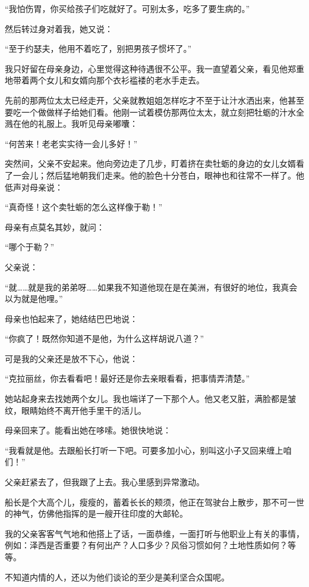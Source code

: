 \documentclass[12pt,UTF-8,openany]{ctexbook}
\begin{document}
\begin{large}
    “我怕伤胃，你买给孩子们吃就好了。可别太多，吃多了要生病的。”
    
    然后转过身对着我，她又说：
    
    “至于约瑟夫，他用不着吃了，别把男孩子惯坏了。”
    
    我只好留在母亲身边，心里觉得这种待遇很不公平。我一直望着父亲，看见他郑重地带着两个女儿和女婿向那个衣衫褴褛的老水手走去。
    
    先前的那两位太太已经走开，父亲就教姐姐怎样吃才不至于让汁水洒出来，他甚至要吃一个做做样子给她们看。他刚一试着模仿那两位太太，就立刻把牡蛎的汁水全溅在他的礼服上。我听见母亲嘟囔：
    
    “何苦来！老老实实待一会儿多好！”
    
    突然间，父亲不安起来。他向旁边走了几步，盯着挤在卖牡蛎的身边的女儿女婿看了一会儿；然后猛地朝我们走来。他的脸色十分苍白，眼神也和往常不一样了。他低声对母亲说：
    
    “真奇怪！这个卖牡蛎的怎么这样像于勒！”
    
    母亲有点莫名其妙，就问：
    
    “哪个于勒？”
    
    父亲说：
    
    “就……就是我的弟弟呀……如果我不知道他现在是在美洲，有很好的地位，我真会以为就是他哩。”
    
    母亲也怕起来了，她结结巴巴地说：
    
    “你疯了！既然你知道不是他，为什么这样胡说八道？”
    
    可是我的父亲还是放不下心，他说：
    
    “克拉丽丝，你去看看吧！最好还是你去亲眼看看，把事情弄清楚。”
    
    她站起身来去找她两个女儿。我也端详了一下那个人。他又老又脏，满脸都是皱纹，眼睛始终不离开他手里干的活儿。
    
    母亲回来了。能看出她在哆嗦。她很快地说：
    
    “我看就是他。去跟船长打听一下吧。可要多加小心，别叫这小子又回来缠上咱们！”
    
    父亲赶紧去了，但我跟了上去。我心里感到异常激动。
    
    船长是个大高个儿，瘦瘦的，蓄着长长的颊须，他正在驾驶台上散步，那不可一世的神气，仿佛他指挥的是一艘开往印度的大邮轮。
    
    我的父亲客客气气地和他搭上了话，一面恭维，一面打听与他职业上有关的事情，例如：泽西是否重要？有何出产？人口多少？风俗习惯如何？土地性质如何？等等。
    
    不知道内情的人，还以为他们谈论的至少是美利坚合众国呢。
    

\end{large}
\end{document}
